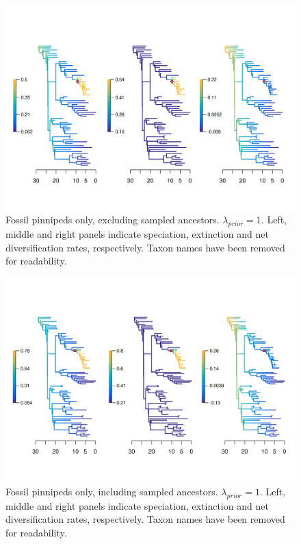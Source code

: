 \documentclass[a4paper, 12pt]{article}
\begin{document}
\begin{figure}[H]
  \centering
  \includegraphics[width = \linewidth]{figures/diversification/fossil-only/sensitivity-analysis-fossil-only.png}
  \caption{Fossil pinnipeds only, excluding sampled ancestors. $\lambda_{prior} = 1$. Left, middle and right panels indicate speciation, extinction and net diversification rates, respectively. Taxon names have been removed  for readability.}
  \label{fig-fossil-only-noanc}
\end{figure}

\begin{figure}[H]
  \centering
  \includegraphics[width = \linewidth]{figures/diversification/fossil-only-with-sampled-ancestors/sensitivity-analysis-fossil-only-full.png}
  \caption{Fossil pinnipeds only, including sampled ancestors. $\lambda_{prior} = 1$. Left, middle and right panels indicate speciation, extinction and net diversification rates, respectively. Taxon names have been removed  for readability.}
  \label{fig-fossil-only-full}
\end{figure}
\end{document}
